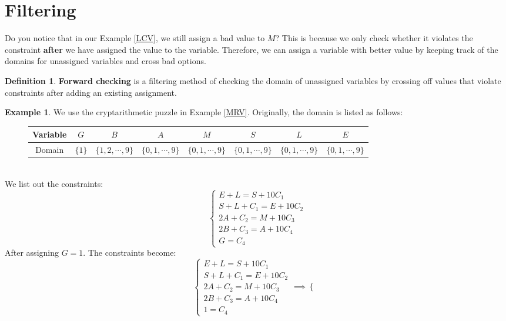 \documentclass{article}
\theoremstyle{definition}
\newtheorem{definition}{Definition}[section]
\newtheorem{example}{Example}[definition]
\begin{document}
\section{Filtering}
Do you notice that in our Example \ref{LCV}, we still assign a bad value to $M$? This is because we only check whether it violates the constraint \textbf{after} we have assigned the value to the variable. Therefore, we can assign a variable with better value by keeping track of the domains for unassigned variables and cross bad options.
\begin{definition}
	\textbf{Forward checking} is a filtering method of checking the domain of unassigned variables by crossing off values that violate constraints after adding an existing assignment. 
\end{definition}
\begin{example}
	\label{Forward checking}
	We use the cryptarithmetic puzzle in Example \ref{MRV}. Originally, the domain is listed as follows:
	\begin{figure}[h]
		\centering
		\begin{tabular}{|c||c|c|c|c|c|c|c|}
			\hline
			Variable & $G$ & $B$ & $A$ & $M$ & $S$ & $L$ & $E$\\
			\hline
			Domain & $\{1\}$ & $\{1,2,\cdots,9\}$ & $\{0,1,\cdots,9\}$ & $\{0,1,\cdots,9\}$ & $\{0,1,\cdots,9\}$ & $\{0,1,\cdots,9\}$ & $\{0,1,\cdots,9\}$\\
			\hline
		\end{tabular}
	\end{figure}\\
	We list out the constraints:
	\begin{equation*}
		\begin{cases}
			E+L=S+10C_{1}\\
			S+L+C_{1}=E+10C_{2}\\
			2A+C_{2}=M+10C_{3}\\
			2B+C_{3}=A+10C_{4}\\
			G=C_{4}
		\end{cases}
	\end{equation*}
	After assigning $G=1$. The constraints become:
	\begin{equation*}
		\begin{cases}
			E+L=S+10C_{1}\\
			S+L+C_{1}=E+10C_{2}\\
			2A+C_{2}=M+10C_{3}\\
			2B+C_{3}=A+10C_{4}\\
			1=C_{4}
		\end{cases}\implies\begin{cases}

\end{cases}
\end{equation*}
\end{example}
\end{document}
